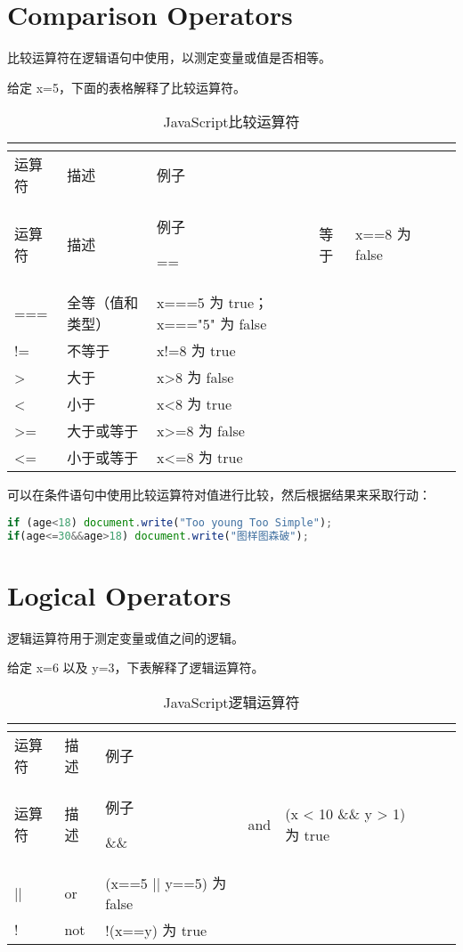 \section{Comparison Operators}

比较运算符在逻辑语句中使用，以测定变量或值是否相等。

给定 x=5，下面的表格解释了比较运算符。

\begin{longtable}{|m{120pt}|m{120pt}|m{120pt}|}
\tabularnewline\hline
运算符	&描述	&例子
\endhead

\caption{JavaScript比较运算符}\\
\hline
运算符	&描述	&例子
\endfirsthead

\endfoot

\endlastfoot
\hline
=\/=		&等于				& x=\/=8 为 false\\
\hline
=\/=\/=		&全等（值和类型）	&x=\/=\/=5 为 true；x=\/=\/="5" 为 false\\
\hline
!\/=			&不等于			& x!\/=8 为 true\\
\hline
>			&大于				& x>8 为 false\\
\hline
<			&小于				& x<8 为 true\\
\hline
>\/=		&大于或等于		&x>\/=8 为 false\\
\hline
<\/=		&小于或等于		&x<\/=8 为 true\\
\hline
\end{longtable}

可以在条件语句中使用比较运算符对值进行比较，然后根据结果来采取行动：

\begin{lstlisting}[language=JavaScript]
if (age<18) document.write("Too young Too Simple");
if(age<=30&&age>18) document.write("图样图森破");
\end{lstlisting}



\section{Logical Operators}


逻辑运算符用于测定变量或值之间的逻辑。

给定 x=6 以及 y=3，下表解释了逻辑运算符。


\begin{longtable}{|m{120pt}|m{120pt}|m{120pt}|}
\tabularnewline\hline
运算符	&描述	&例子
\endhead

\caption{JavaScript逻辑运算符}\\
\hline
运算符	&描述	&例子
\endfirsthead

\endfoot

\endlastfoot
\hline
\&\&	&and	&(x < 10 \&\& y > 1) 为 true\\
\hline
||		&or		& (x=\/=5 || y=\/=5) 为 false\\
\hline
!		&not	&!(x=\/=y) 为 true\\
\hline
\end{longtable}




